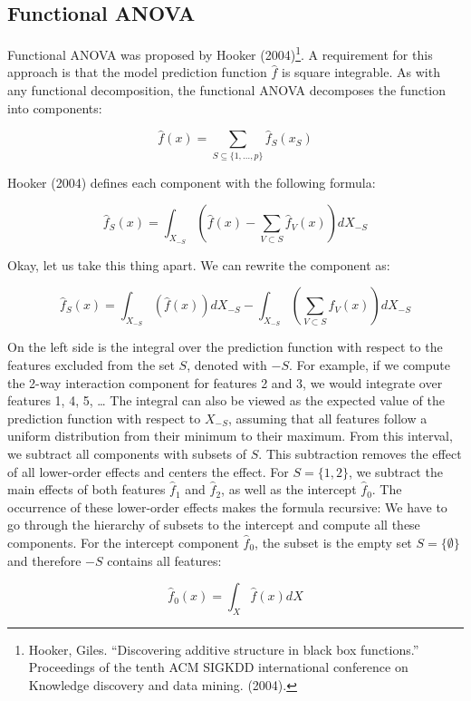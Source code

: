 \documentclass[
  11pt,
]{scrbook}
\begin{document}
\hypertarget{functional-anova}{%
\subsection{Functional ANOVA}\label{functional-anova}}

Functional ANOVA was proposed by Hooker (2004)\footnote{Hooker, Giles. ``Discovering additive structure in black box functions.'' Proceedings of the tenth ACM SIGKDD international conference on Knowledge discovery and data mining. (2004).}.
A requirement for this approach is that the model prediction function \(\hat{f}\) is square integrable.
As with any functional decomposition, the functional ANOVA decomposes the function into components:

\[\hat{f}(x) = \sum_{S\subseteq\{1,\ldots,p\}} \hat{f}_S(x_S)\]

Hooker (2004) defines each component with the following formula:

\[\hat{f}_S(x) = \int_{X_{-S}} \left( \hat{f}(x) - \sum_{V \subset S} \hat{f}_V(x)\right) d X_{-S}\]

Okay, let us take this thing apart.
We can rewrite the component as:

\[\hat{f}_S(x) = \int_{X_{-S}} \left( \hat{f}(x)\right) d X_{-S} - \int_{X_{-S}} \left(\sum_{V \subset S} \hat{f}_V(x) \right) d X_{-S}\]

On the left side is the integral over the prediction function with respect to the features excluded from the set \(S\), denoted with \(-S\).
For example, if we compute the 2-way interaction component for features 2 and 3, we would integrate over features 1, 4, 5, \ldots{}
The integral can also be viewed as the expected value of the prediction function with respect to \(X_{-S}\), assuming that all features follow a uniform distribution from their minimum to their maximum.
From this interval, we subtract all components with subsets of \(S\).
This subtraction removes the effect of all lower-order effects and centers the effect.
For \(S=\{1,2\}\), we subtract the main effects of both features \(\hat{f}_1\) and \(\hat{f}_2\), as well as the intercept \(\hat{f}_0\).
The occurrence of these lower-order effects makes the formula recursive:
We have to go through the hierarchy of subsets to the intercept and compute all these components.
For the intercept component \(\hat{f}_0\), the subset is the empty set \(S=\{\emptyset\}\) and therefore \(-S\) contains all features:

\[\hat{f}_0(x) = \int_{X} \hat{f}(x) dX\]
\end{document}
